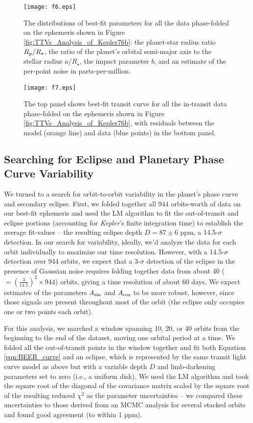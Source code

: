 \documentclass[manuscript]{aastex62}
\newcommand{\kepler}{{\it Kepler}}
\begin{document}
\begin{figure}
    \texttt{[image: f6.eps]}
    \caption{The distributions of best-fit parameters for all the data phase-folded on the ephemeris shown in Figure \ref{fig:TTVs_Analysis_of_Kepler76b}: the planet-star radius ratio $R_{\rm p}/R_\star$, the ratio of the planet's orbital semi-major axis to the stellar radius $a/R_\star$, the impact parameter $b$, and an estimate of the per-point noise in parts-per-million.}
    \label{fig:folded-transit-corner-plot_Analysis-of-Kepler76b}
\end{figure}

\begin{figure}
    \texttt{[image: f7.eps]}
    \caption{The top panel shows best-fit transit curve for all the in-transit data phase-folded on the ephemeris shown in Figure \ref{fig:TTVs_Analysis_of_Kepler76b}, with residuals between the model (orange line) and data (blue points) in the bottom panel.\label{fig:final_best_fit_transit_Analysis_of_Kepler76b}}
\end{figure}

\subsection{Searching for Eclipse and Planetary Phase Curve Variability}
\label{sec:Searching}
We turned to a search for orbit-to-orbit variability in the planet's phase curve and secondary eclipse. First, we folded together all 944 orbits-worth of data on our best-fit ephemeris and used the LM algorithm to fit the out-of-transit and eclipse portions (accounting for \kepler's finite integration time) to establish the average fit-values -- the resulting eclipse depth $D = 87 \pm 6$ ppm, a 14.5-$\sigma$ detection. In our search for variability, ideally, we'd analyze the data for each orbit individually to maximize our time resolution. However, with a 14.5-$\sigma$ detection over 944 orbits, we expect that a 3-$\sigma$ detection of the eclipse in the presence of Gaussian noise requires folding together data from about 40 ($=\left( \frac{3}{14.5} \right)^2 \times 944 $) orbits, giving a time resolution of about 60 days. We expect estimates of the parameters $A_{\rm sin}$ and $A_{\rm cos}$ to be more robust, however, since those signals are present throughout most of the orbit (the eclipse only occupies one or two points each orbit). 

For this analysis, we marched a window spanning 10, 20, or 40 orbits from the beginning to the end of the dataset, moving one orbital period at a time. We folded all the out-of-transit points in the window together and fit both Equation \ref{eqn:BEER_curve} and an eclipse, which is represented by the same transit light curve model as above but with a variable depth $D$ and limb-darkening parameters set to zero (i.e., a uniform disk). We used the LM algorithm and took the square root of the diagonal of the covariance matrix scaled by the square root of the resulting reduced $\chi^2$ as the parameter uncertainties -- we compared these uncertainties to those derived from an MCMC analysis for several stacked orbits and found good agreement (to within 1 ppm). 
\end{document}
